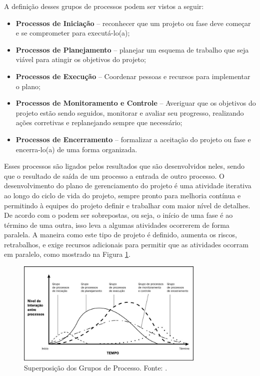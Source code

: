 A definição desses grupos de processos podem ser vistos a seguir:

\begin{itemize}
	\item \textbf{Processos de Iniciação} – reconhecer que um projeto ou fase deve começar e se comprometer para executá-lo(a);
	\item \textbf{Processos de Planejamento} – planejar um esquema de trabalho que seja viável para atingir os objetivos do projeto;
	\item \textbf{Processos de Execução} – Coordenar pessoas e recursos para implementar o plano;
	\item \textbf{Processos de Monitoramento e Controle} – Averiguar que os objetivos do projeto estão sendo seguidos, monitorar e avaliar seu progresso, realizando ações corretivas e replanejando sempre que necessário; 
	\item \textbf{Processos de Encerramento} – formalizar a aceitação do projeto ou
	fase e encerra-lo(a) de uma forma organizada.
\end{itemize}

Esses processos são ligados pelos resultados que são desenvolvidos neles, sendo que o resultado de saída de um processo a entrada de outro processo. O desenvolvimento do plano de gerenciamento do projeto é uma atividade iterativa ao longo do ciclo de vida do projeto, sempre pronto para melhoria contínua e permitindo à equipes do projeto definir e trabalhar com maior nível de detalhes. De acordo com o  podem ser sobrepostas, ou seja, o início de uma fase é ao término de uma outra, isso leva a algumas atividades ocorrerem de forma paralela. A maneira como este tipo de projeto  é definido, aumenta os riscos, retrabalhos, e exige recursos adicionais para permitir que as atividades ocorram em paralelo, como mostrado na Figura \ref{img:fases_sobrepostas}.

\begin{figure}[H]
	\centering
	\includegraphics[width=0.8\textwidth]{figuras/fases_pmbok_sobrepostas.jpg}
	\caption{Superposição dos Grupos de Processo. Fonte: .}
	\label{img:fases_sobrepostas}
\end{figure}

